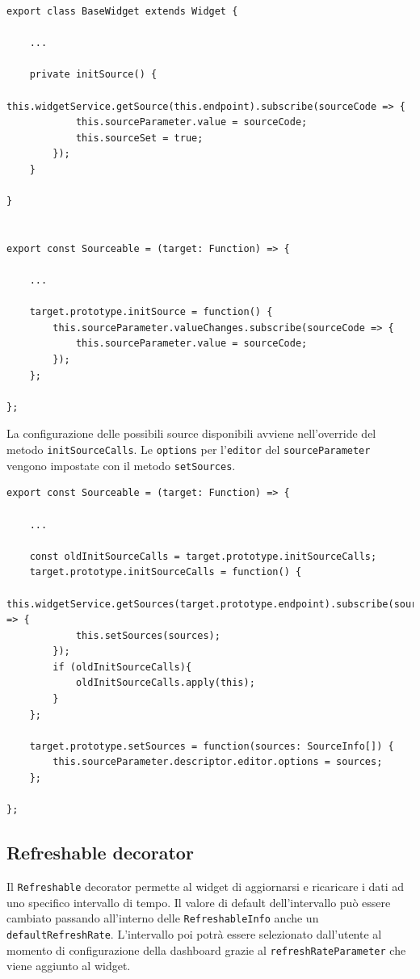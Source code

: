\begin{lstlisting}[caption={Metodo initSource e override}, style=javaScriptCode]
export class BaseWidget extends Widget {
    
    ...
    
    private initSource() {
        this.widgetService.getSource(this.endpoint).subscribe(sourceCode => {
            this.sourceParameter.value = sourceCode;
            this.sourceSet = true;
        });
    }
    
}


export const Sourceable = (target: Function) => {

    ...

    target.prototype.initSource = function() {
        this.sourceParameter.valueChanges.subscribe(sourceCode => {
            this.sourceParameter.value = sourceCode;
        });
    };

};
\end{lstlisting}
La configurazione delle possibili source disponibili avviene nell'override del metodo \verb|initSourceCalls|. Le \verb|options| per l'\verb|editor| del \verb|sourceParameter| vengono impostate con il metodo \verb|setSources|.\\ 
\begin{lstlisting}[caption={Metodo setSources e override del metodo initSourceCalls all'interno del Sourceable Decorator}, style=javaScriptCode]
export const Sourceable = (target: Function) => {

    ...
    
    const oldInitSourceCalls = target.prototype.initSourceCalls;
    target.prototype.initSourceCalls = function() {
        this.widgetService.getSources(target.prototype.endpoint).subscribe(sources => {
            this.setSources(sources);
        });
        if (oldInitSourceCalls){
            oldInitSourceCalls.apply(this);
        }
    };

    target.prototype.setSources = function(sources: SourceInfo[]) {
        this.sourceParameter.descriptor.editor.options = sources;
    };

};
\end{lstlisting}
\subsection{Refreshable decorator}
Il \verb|Refreshable| decorator permette al widget di aggiornarsi e ricaricare i dati ad uno specifico intervallo di tempo. Il valore di default dell'intervallo può essere cambiato passando all'interno delle \verb|RefreshableInfo| anche un \verb|defaultRefreshRate|.
L'intervallo poi potrà essere selezionato dall'utente al momento di configurazione della dashboard grazie al \verb|refreshRateParameter| che viene aggiunto al widget.\\

